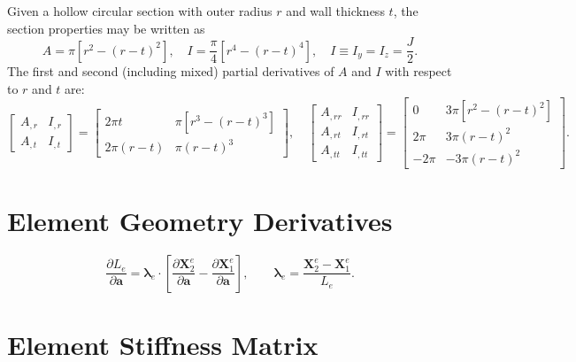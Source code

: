 \documentclass[12pt,a4paper,article]{memoir} %
\begin{document}
Given a hollow circular section with outer radius $r$ and wall thickness $t$, the section properties may be written as
\begin{equation}
  A = \pi \left[ r^2 - (r-t)^2 \right], \quad I = \frac{\pi}{4} \left[ r^4 - (r-t)^4 \right], \quad I \equiv I_y = I_z = \frac{J}{2}.
\end{equation}
The first and second (including mixed) partial derivatives of $A$ and $I$ with respect to $r$ and $t$ are:
\begin{equation}
  \left[ \begin{array}{cc} A_{,r} & I_{,r} \\ A_{,t} & I_{,t} \end{array} \right] = \left[ \begin{array}{cc} 2 \pi t & \pi \left[ r^3 - (r-t)^3 \right] \\ 2 \pi (r-t) & \pi (r - t)^3 \end{array} \right], \quad
  \left[ \begin{array}{cc} A_{,rr} & I_{,rr} \\ A_{,rt} & I_{,rt} \\ A_{,tt} & I_{,tt} \end{array} \right] = \left[ \begin{array}{cc} 0 & 3 \pi \left[ r^2 - (r-t)^2 \right] \\ 2 \pi & 3 \pi (r-t)^2 \\ - 2 \pi & - 3 \pi (r-t)^2 \end{array} \right].
\end{equation}

\section{Element Geometry Derivatives}

\begin{equation}
        \frac{\partial L_e}{\partial \mathbf{a}} = \boldsymbol{\lambda}_e \cdot \left[ \frac{\partial \mathbf{X}_2^e}{\partial \mathbf{a}} - \frac{\partial \mathbf{X}_1^e}{\partial \mathbf{a}} \right], \qquad \boldsymbol{\lambda}_e = \frac{\mathbf{X}_2^e - \mathbf{X}_1^e}{L_e}.
\end{equation}

\section{Element Stiffness Matrix}
\end{document}
